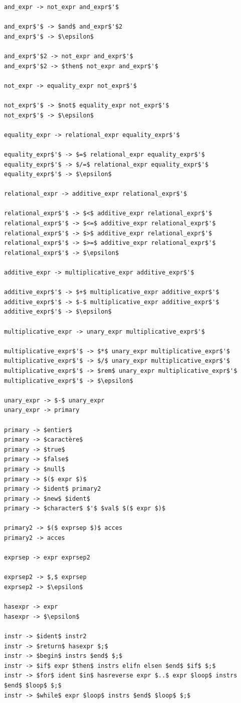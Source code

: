 \documentclass[french,a4paper]{article}
\begin{document}
\begin{lstlisting}[label={lst:lstlisting9}]
and_expr -> not_expr and_expr$'$

and_expr$'$ -> $and$ and_expr$'$2
and_expr$'$ -> $\epsilon$

and_expr$'$2 -> not_expr and_expr$'$
and_expr$'$2 -> $then$ not_expr and_expr$'$

not_expr -> equality_expr not_expr$'$

not_expr$'$ -> $not$ equality_expr not_expr$'$
not_expr$'$ -> $\epsilon$

equality_expr -> relational_expr equality_expr$'$

equality_expr$'$ -> $=$ relational_expr equality_expr$'$
equality_expr$'$ -> $/=$ relational_expr equality_expr$'$
equality_expr$'$ -> $\epsilon$

relational_expr -> additive_expr relational_expr$'$

relational_expr$'$ -> $<$ additive_expr relational_expr$'$
relational_expr$'$ -> $<=$ additive_expr relational_expr$'$
relational_expr$'$ -> $>$ additive_expr relational_expr$'$
relational_expr$'$ -> $>=$ additive_expr relational_expr$'$
relational_expr$'$ -> $\epsilon$

additive_expr -> multiplicative_expr additive_expr$'$

additive_expr$'$ -> $+$ multiplicative_expr additive_expr$'$
additive_expr$'$ -> $-$ multiplicative_expr additive_expr$'$
additive_expr$'$ -> $\epsilon$

multiplicative_expr -> unary_expr multiplicative_expr$'$

multiplicative_expr$'$ -> $*$ unary_expr multiplicative_expr$'$
multiplicative_expr$'$ -> $/$ unary_expr multiplicative_expr$'$
multiplicative_expr$'$ -> $rem$ unary_expr multiplicative_expr$'$
multiplicative_expr$'$ -> $\epsilon$

unary_expr -> $-$ unary_expr
unary_expr -> primary

primary -> $entier$
primary -> $caractère$
primary -> $true$
primary -> $false$
primary -> $null$
primary -> $($ expr $)$
primary -> $ident$ primary2
primary -> $new$ $ident$
primary -> $character$ $'$ $val$ $($ expr $)$

primary2 -> $($ exprsep $)$ acces
primary2 -> acces

exprsep -> expr exprsep2

exprsep2 -> $,$ exprsep
exprsep2 -> $\epsilon$

hasexpr -> expr
hasexpr -> $\epsilon$

instr -> $ident$ instr2
instr -> $return$ hasexpr $;$
instr -> $begin$ instrs $end$ $;$
instr -> $if$ expr $then$ instrs elifn elsen $end$ $if$ $;$
instr -> $for$ ident $in$ hasreverse expr $..$ expr $loop$ instrs $end$ $loop$ $;$
instr -> $while$ expr $loop$ instrs $end$ $loop$ $;$


\end{lstlisting}
\end{document}
